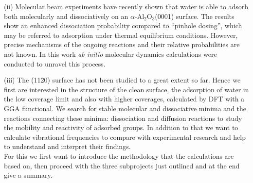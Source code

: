 \documentclass[11pt,DIV=13,BCOR=5mm,a4paper,headinclude]{scrbook}
\begin{document}
(ii) Molecular beam experiments have recently shown that water is able to adsorb both molecularly and dissociatively on an $\alpha$-Al$_{\text{2}}$O$_{\text{3}}$(0001) surface\cite{Wirth2014}.
The results show an enhanced dissociation probability compared to ``pinhole dosing'', which may be referred to adsorption under thermal equilibrium conditions.
However, precise mechanisms of the ongoing reactions  and their relative probabilities are not known.
In this work \textit{ab initio} molecular dynamics calculations were conducted to unravel this process.


(iii) The (11\=20) surface has not been studied to a great extent so far.
Hence we first are interested in the structure of the clean surface, the adsorption of water in the low coverage limit and also with higher coverages, calculated by DFT with a GGA functional.
We search for stable molecular and dissociative minima and the reactions connecting these minima: dissociation and diffusion reactions to study the mobility and reactivity of adsorbed groups.
In addition to that we want to calculate vibrational frequencies to compare with experimental research and help to understand and interpret their findings.
\\

For this we first want to introduce the methodology that the calculations are based on, then proceed with the three subprojects just outlined and at the end give a summary.

\end{document}
